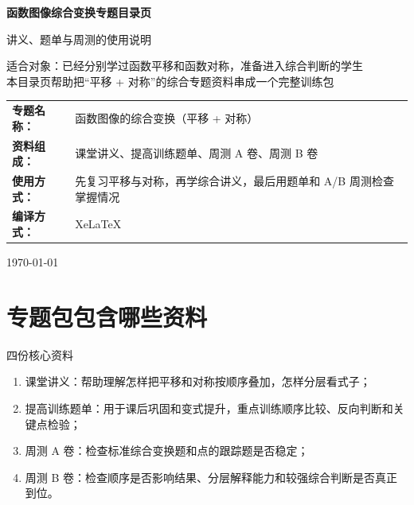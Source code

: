 \documentclass[11pt,a4paper,fontset=fandol]{ctexart}
\begin{document}
\thispagestyle{empty}
\begin{titlepage}
\centering
\vspace*{0.9cm}

\begin{tcolorbox}[
  enhanced,
  width=0.92\textwidth,
  colback=white,
  colframe=mainblue,
  boxrule=1pt,
  arc=0mm,
  left=6mm,
  right=6mm,
  top=8mm,
  bottom=8mm
]
\centering

{\fontsize{24}{30}\selectfont\bfseries 函数图像综合变换专题目录页\par}
\vspace{0.65cm}
{\fontsize{17}{22}\selectfont 讲义、题单与周测的使用说明\par}

\vspace{1cm}
\begin{tcolorbox}[colback=lightblue,colframe=mainblue,width=0.84\textwidth,boxrule=1pt]
\centering
{\large 适合对象：已经分别学过函数平移和函数对称，准备进入综合判断的学生}\\[0.35em]
{\normalsize 本目录页帮助把“平移 + 对称”的综合专题资料串成一个完整训练包}
\end{tcolorbox}

\vspace{1.0cm}
\renewcommand{\arraystretch}{1.42}
\begin{tabular}{>{\bfseries}p{3.5cm}p{8cm}}
专题名称： & 函数图像的综合变换（平移 + 对称） \\
资料组成： & 课堂讲义、提高训练题单、周测 A 卷、周测 B 卷 \\
使用方式： & 先复习平移与对称，再学综合讲义，最后用题单和 A/B 周测检查掌握情况 \\
编译方式： & XeLaTeX \\
\end{tabular}

\vspace{0.9cm}
{\large \today\par}
\end{tcolorbox}
\end{titlepage}

\tableofcontents
\newpage

\section{专题包包含哪些资料}

\begin{goalbox}{四份核心资料}
\begin{enumerate}
  \item 课堂讲义：帮助理解怎样把平移和对称按顺序叠加，怎样分层看式子；
  \item 提高训练题单：用于课后巩固和变式提升，重点训练顺序比较、反向判断和关键点检验；
  \item 周测 A 卷：检查标准综合变换题和点的跟踪题是否稳定；
  \item 周测 B 卷：检查顺序是否影响结果、分层解释能力和较强综合判断是否真正到位。
\end{enumerate}
\end{goalbox}
\end{document}
